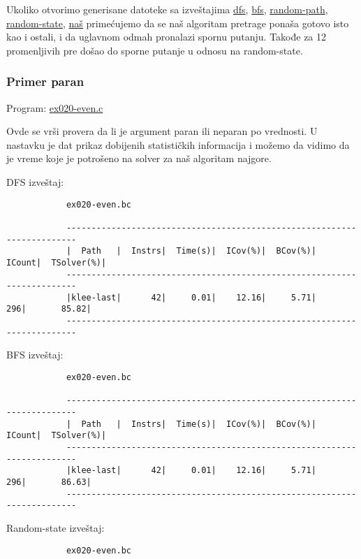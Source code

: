 \documentclass[a4paper]{article}
\begin{document}
{	 	Ukoliko otvorimo generisane datoteke sa izveštajima \href{file:primeri/report_dfs.txt}{dfs}, \href{file:primeri/report_bfs.txt}{bfs}, \href{file:primeri/report_random-path.txt}{random-path},
	 	\href{file:primeri/report_random-state.txt}{random-state},
	 	\href{file:primeri/report_nas.txt}{naš} primećujemo da se naš algoritam pretrage ponaša gotovo isto kao i ostali, i da uglavnom odmah pronalazi spornu putanju. Takođe za 12 promenljivih pre došao do sporne putanje u odnosu na random-state.  
	 	
	 	
	\subsubsection{Primer paran}
	
		Program: \href{file:primeri/ex020-even.c}{ex020-even.c}
		
		Ovde se vrši provera da li je argument paran ili neparan po vrednosti. U nastavku je dat prikaz dobijenih statističkih informacija i možemo da vidimo da je vreme koje je potrošeno na solver za naš algoritam najgore. 
				
		DFS izveštaj:
		
		\begin{verbatim}
			ex020-even.bc
			
			------------------------------------------------------------------------
			|  Path   |  Instrs|  Time(s)|  ICov(%)|  BCov(%)|  ICount|  TSolver(%)|
			------------------------------------------------------------------------
			|klee-last|      42|     0.01|    12.16|     5.71|     296|       85.82|
			------------------------------------------------------------------------
		\end{verbatim}
		
		BFS izveštaj:
		
		\begin{verbatim}
			ex020-even.bc
			
			------------------------------------------------------------------------
			|  Path   |  Instrs|  Time(s)|  ICov(%)|  BCov(%)|  ICount|  TSolver(%)|
			------------------------------------------------------------------------
			|klee-last|      42|     0.01|    12.16|     5.71|     296|       86.63|
			------------------------------------------------------------------------
		\end{verbatim}
		
		Random-state izveštaj:
		
		\begin{verbatim}
			ex020-even.bc
			

\end{verbatim}}
\end{document}
